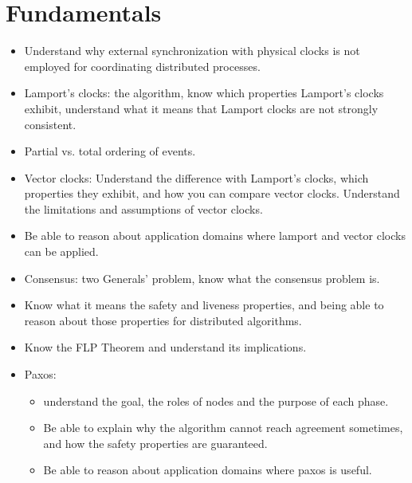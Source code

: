 \documentclass[a4paper]{report}
\begin{document}
\chapter*{Fundamentals}
\begin{itemize}
  \item Understand why external synchronization with physical clocks is not employed for
  coordinating distributed processes.
  \item Lamport’s clocks: the algorithm, know which properties Lamport’s clocks exhibit,
  understand what it means that Lamport clocks are not strongly consistent.
  \item Partial vs. total ordering of events.
  \item Vector clocks: Understand the difference with Lamport’s clocks, which properties they
  exhibit, and how you can compare vector clocks. Understand the limitations and
  assumptions of vector clocks.
  \item Be able to reason about application domains where lamport and vector clocks can be
  applied.
  \item Consensus: two Generals’ problem, know what the consensus problem is.
  \item Know what it means the safety and liveness properties, and being able to reason
  about those properties for distributed algorithms.
  \item Know the FLP Theorem and understand its implications.
  \item Paxos:
  \begin{itemize}
    \item understand the goal, the roles of nodes and the purpose of each phase.
    \item Be able to explain why the algorithm cannot reach agreement sometimes, and how
    the safety properties are guaranteed.
    \item Be able to reason about application domains where paxos is useful.
  \end{itemize}
\end{itemize}
\end{document}
